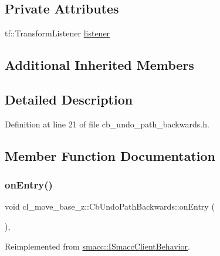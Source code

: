 \subsection*{Private Attributes}
\begin{DoxyCompactItemize}
\item 
tf\+::\+Transform\+Listener \hyperlink{classcl__move__base__z_1_1CbUndoPathBackwards_add2b6a0f1c19654a0cf07209fc123a71}{listener}
\end{DoxyCompactItemize}
\subsection*{Additional Inherited Members}


\subsection{Detailed Description}


Definition at line 21 of file cb\+\_\+undo\+\_\+path\+\_\+backwards.\+h.



\subsection{Member Function Documentation}
\mbox{\label{classcl__move__base__z_1_1CbUndoPathBackwards_a32e680530375b62c7053bf173f6b2b1b}} 
\subsubsection{\texorpdfstring{on\+Entry()}{onEntry()}}
{\footnotesize\ttfamily void cl\+\_\+move\+\_\+base\+\_\+z\+::\+Cb\+Undo\+Path\+Backwards\+::on\+Entry (\begin{DoxyParamCaption}{ }\end{DoxyParamCaption})\hspace{0.3cm}{\ttfamily [override]}, {\ttfamily [virtual]}}



Reimplemented from \hyperlink{classsmacc_1_1ISmaccClientBehavior_a9877684b1954429719826e2d0924d980}{smacc\+::\+I\+Smacc\+Client\+Behavior}.



